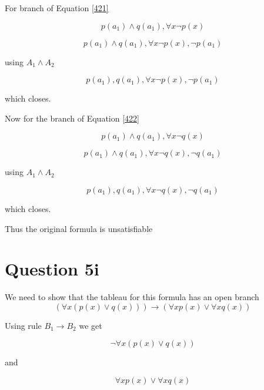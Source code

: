 \documentclass[10pt,a4paper]{article}
\begin{document}
 For branch of Equation \ref{421}
 
 \begin{equation}
  p(a_1) \wedge q(a_1),\forall x\neg p(x)
 \end{equation}
 
  \begin{equation}
  p(a_1) \wedge q(a_1),\forall x\neg p(x),\neg p(a_1)
 \end{equation}
 
using $A_1\wedge A_2$

  \begin{equation}
  p(a_1), q(a_1),\forall x\neg p(x),\neg p(a_1)
 \end{equation}
 
 which closes.
 
 Now for the branch of Equation \ref{422}

 \begin{equation}
  p(a_1) \wedge q(a_1),\forall x\neg q(x)
 \end{equation}
 
  \begin{equation}
  p(a_1) \wedge q(a_1),\forall x\neg q(x),\neg q(a_1)
 \end{equation}
 
using $A_1\wedge A_2$

  \begin{equation}
  p(a_1), q(a_1),\forall x\neg q(x),\neg q(a_1)
 \end{equation}
 
 which closes.

 Thus the original formula is unsatisfiable
 
 
 \section{Question 5i}
 We need to show that the tableau for this formula has an open branch
 \begin{equation}
 (\forall x(p(x) \vee q(x)))\rightarrow (\forall x p(x) \vee \forall xq(x))
\end{equation}

Using rule $B_1 \rightarrow B_2$ we get

\begin{equation}
\label{511}
 \neg\forall x (p(x)\vee q(x))
\end{equation}

and 

\begin{equation}
\label{512}
 \forall x p(x) \vee \forall x q(x)
\end{equation}
\end{document}

